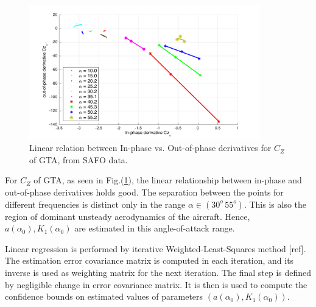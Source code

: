 \documentclass{AIAA}
\begin{document}
\begin{figure}
\centering
\includegraphics[width=100mm]{CZ_ip_op}
\caption{Linear relation between In-phase vs. Out-of-phase derivatives for $C_Z$ of GTA, from SAFO data.}
\label{fig:GTA_Cz_Ts}
\end{figure}
For $C_Z$ of GTA, as seen in Fig.(\ref{fig:GTA_Cz_Ts}), the linear relationship between in-phase and out-of-phase derivatives holds good. The separation between the points for different frequencies is distinct only in the range $\alpha \in (30^o \, 55^o)$. This is also the region of dominant unsteady aerodynamics of the aircraft. Hence, $a(\alpha_0),K_1(\alpha_0)$ are estimated in this angle-of-attack range.

Linear regression is performed by iterative Weighted-Least-Squares method [ref]. The estimation error covariance matrix is computed in each iteration, and its inverse is used as weighting matrix for the next iteration. The final step is defined by negligible change in error covariance matrix. It is then is used to compute the confidence bounds on estimated values of parameters $(a(\alpha_0),K_1(\alpha_0))$.
\end{document}
